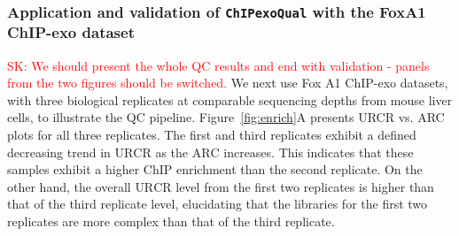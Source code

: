 \documentclass{bmcart}
\newcommand{\pname}[1]{\texttt{ChIPexoQual}}
\newcommand{\SK}[1]{\textcolor{red}{SK: #1}}
\begin{document}
\subsubsection*{Application and validation of \pname{} with the FoxA1
  ChIP-exo dataset}
\SK{We should present the whole QC results and end with validation -  panels from the two figures should be switched.}
We next use Fox A1 ChIP-exo datasets, with three biological replicates at comparable sequencing depths from mouse liver cells, 
to illustrate the QC pipeline. 
Figure~\ref{fig:enrich}A presents  URCR vs. ARC plots
for all three replicates. The first and third replicates exhibit a defined
decreasing trend in  $\mbox{URCR}$ as the $\mbox{ARC}$ increases. This indicates that
these samples exhibit a higher ChIP enrichment than the
second replicate. On the other hand, the overall $\mbox{URCR}$ level
from the first two replicates is higher than that of the third replicate
level,  elucidating  that the  libraries for the first two replicates are more complex than that of  the
third replicate. 


\end{document}
